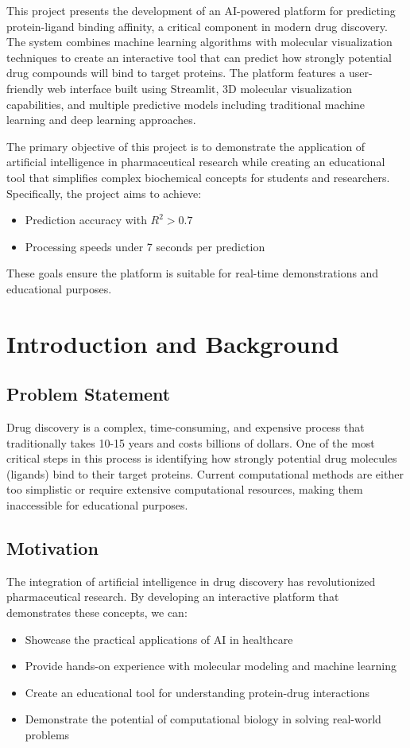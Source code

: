 \documentclass[12pt,a4paper]{article}
\begin{document}
This project presents the development of an AI-powered platform for predicting protein-ligand binding affinity, a critical component in modern drug discovery. The system combines machine learning algorithms with molecular visualization techniques to create an interactive tool that can predict how strongly potential drug compounds will bind to target proteins. The platform features a user-friendly web interface built using Streamlit, 3D molecular visualization capabilities, and multiple predictive models including traditional machine learning and deep learning approaches.

The primary objective of this project is to demonstrate the application of artificial intelligence in pharmaceutical research while creating an educational tool that simplifies complex biochemical concepts for students and researchers. Specifically, the project aims to achieve:

\begin{itemize}
    \item Prediction accuracy with $R^2 > 0.7$
    \item Processing speeds under 7 seconds per prediction
\end{itemize}

These goals ensure the platform is suitable for real-time demonstrations and educational purposes.

\section{Introduction and Background}

\subsection{Problem Statement}
Drug discovery is a complex, time-consuming, and expensive process that traditionally takes 10-15 years and costs billions of dollars. One of the most critical steps in this process is identifying how strongly potential drug molecules (ligands) bind to their target proteins. Current computational methods are either too simplistic or require extensive computational resources, making them inaccessible for educational purposes.

\subsection{Motivation}
The integration of artificial intelligence in drug discovery has revolutionized pharmaceutical research. By developing an interactive platform that demonstrates these concepts, we can:
\begin{itemize}
    \item Showcase the practical applications of AI in healthcare
    \item Provide hands-on experience with molecular modeling and machine learning
    \item Create an educational tool for understanding protein-drug interactions
    \item Demonstrate the potential of computational biology in solving real-world problems
\end{itemize}
\end{document}
